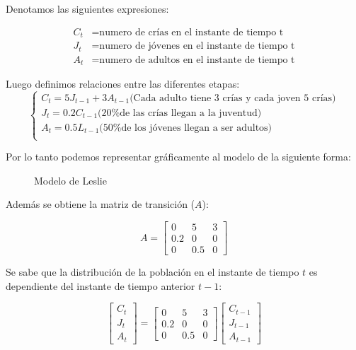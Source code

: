 Denotamos las siguientes expresiones:

\begin{align*}
    C_t &= \text{numero de crías en el instante de tiempo t}\\
    J_t &= \text{numero de jóvenes en el instante de tiempo t}\\
    A_t &= \text{numero de adultos en el instante de tiempo t}
\end{align*}

Luego definimos relaciones entre las diferentes etapas:
\[
\begin{cases}
    C_t = 5 J_{t-1} + 3 A_{t-1} \text{(Cada adulto tiene 3 crías y cada joven 5 crías)}\\
    J_t = 0.2 C_{t-1} \text{(20\% de las crías llegan a la juventud)}\\
    A_t = 0.5 L_{t-1} \text{(50\% de los jóvenes llegan a ser adultos)}\\
\end{cases}
\]

Por lo tanto podemos representar gráficamente al modelo de la siguiente forma:
\begin{figure}[htb]

\centering
{}

\caption{Modelo de Leslie}
\end{figure}

Además se obtiene la matriz de transición ($A$):

\[
A =
\left[
    \begin{array}{ccc}
        0 & 5 & 3 \\
        0.2 & 0 & 0 \\
        0 & 0.5 & 0
    \end{array}
\right]
\]

Se sabe que la distribución de la población en el instante de tiempo $t$ es dependiente del instante de tiempo anterior $t-1$:

\[
    \left[
    \begin{array}{c}
        C_t \\
        J_t \\
        A_t
    \end{array}
    \right] = 
    \left[
    \begin{array}{ccc}
        0 & 5 & 3 \\
        0.2 & 0 & 0 \\
        0 & 0.5 & 0
    \end{array}
    \right]
    \left[
    \begin{array}{c}
        C_{t-1} \\
        J_{t-1} \\
        A_{t-1}
    \end{array}
    \right]
\]

